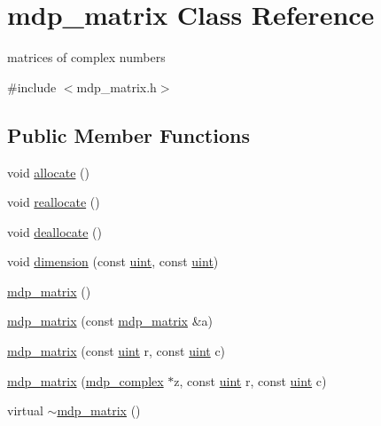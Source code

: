 \hypertarget{classmdp__matrix}{}\section{mdp\+\_\+matrix Class Reference}
\label{classmdp__matrix}


matrices of complex numbers  




{\ttfamily \#include $<$mdp\+\_\+matrix.\+h$>$}

\subsection*{Public Member Functions}
\begin{DoxyCompactItemize}
\item 
void \hyperlink{classmdp__matrix_a1a9cef75d472f8e7ab0665de46321030}{allocate} ()
\item 
void \hyperlink{classmdp__matrix_aae11eac9a3c0f2c0cc05450a67924cda}{reallocate} ()
\item 
void \hyperlink{classmdp__matrix_a37512f689166e890038ec9688d3a171e}{deallocate} ()
\item 
void \hyperlink{classmdp__matrix_a980d0f0a42bb19ba9135a0bf97d85c76}{dimension} (const \hyperlink{mdp__global__vars_8h_a91ad9478d81a7aaf2593e8d9c3d06a14}{uint}, const \hyperlink{mdp__global__vars_8h_a91ad9478d81a7aaf2593e8d9c3d06a14}{uint})
\item 
\hyperlink{classmdp__matrix_a54b72b2aaf4630fce237604942cf6b3d}{mdp\+\_\+matrix} ()
\item 
\hyperlink{classmdp__matrix_a8f70e8e0ad282c3f9c83ff0550eda677}{mdp\+\_\+matrix} (const \hyperlink{classmdp__matrix}{mdp\+\_\+matrix} \&a)
\item 
\hyperlink{classmdp__matrix_a943b6d355ac862b8592648275ba1639f}{mdp\+\_\+matrix} (const \hyperlink{mdp__global__vars_8h_a91ad9478d81a7aaf2593e8d9c3d06a14}{uint} r, const \hyperlink{mdp__global__vars_8h_a91ad9478d81a7aaf2593e8d9c3d06a14}{uint} c)
\item 
\hyperlink{classmdp__matrix_a743bde7a120b947e065c8fd7b658b163}{mdp\+\_\+matrix} (\hyperlink{classmdp__complex}{mdp\+\_\+complex} $\ast$z, const \hyperlink{mdp__global__vars_8h_a91ad9478d81a7aaf2593e8d9c3d06a14}{uint} r, const \hyperlink{mdp__global__vars_8h_a91ad9478d81a7aaf2593e8d9c3d06a14}{uint} c)
\item 
virtual \hyperlink{classmdp__matrix_a5c20b7431f6da6f54c381331f8a09c44}{$\sim$mdp\+\_\+matrix} ()
\item 

\end{DoxyCompactItemize}
